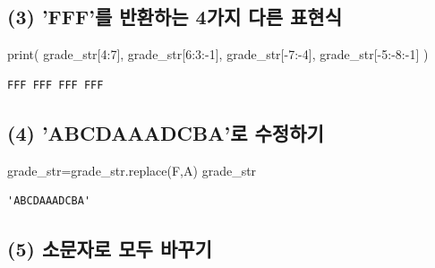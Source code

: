 \documentclass[
  a4paper,
  DIV=11,
  numbers=noendperiod]{scrreprt}
\newenvironment{Shaded}{\begin{snugshade}}{\end{snugshade}}
\newcommand{\BuiltInTok}[1]{\textcolor[rgb]{0.00,0.23,0.31}{#1}}
\newcommand{\DecValTok}[1]{\textcolor[rgb]{0.68,0.00,0.00}{#1}}
\newcommand{\NormalTok}[1]{\textcolor[rgb]{0.00,0.23,0.31}{#1}}
\newcommand{\OperatorTok}[1]{\textcolor[rgb]{0.37,0.37,0.37}{#1}}
\newcommand{\StringTok}[1]{\textcolor[rgb]{0.13,0.47,0.30}{#1}}
\begin{document}
\subsection*{(3) 'FFF'를 반환하는 4가지 다른
표현식}\label{fffuxb97c-uxbc18uxd658uxd558uxb294-4uxac00uxc9c0-uxb2e4uxb978-uxd45cuxd604uxc2dd}

\begin{Shaded}
\begin{Highlighting}[]
\BuiltInTok{print}\NormalTok{(}
\NormalTok{    grade\_str[}\DecValTok{4}\NormalTok{:}\DecValTok{7}\NormalTok{],}
\NormalTok{    grade\_str[}\DecValTok{6}\NormalTok{:}\DecValTok{3}\NormalTok{:}\OperatorTok{{-}}\DecValTok{1}\NormalTok{],}
\NormalTok{    grade\_str[}\OperatorTok{{-}}\DecValTok{7}\NormalTok{:}\OperatorTok{{-}}\DecValTok{4}\NormalTok{],}
\NormalTok{    grade\_str[}\OperatorTok{{-}}\DecValTok{5}\NormalTok{:}\OperatorTok{{-}}\DecValTok{8}\NormalTok{:}\OperatorTok{{-}}\DecValTok{1}\NormalTok{]}
\NormalTok{)}
\end{Highlighting}
\end{Shaded}

\begin{verbatim}
FFF FFF FFF FFF
\end{verbatim}

\subsection*{(4) 'ABCDAAADCBA'로
수정하기}\label{abcdaaadcbauxb85c-uxc218uxc815uxd558uxae30}

\begin{Shaded}
\begin{Highlighting}[]
\NormalTok{grade\_str}\OperatorTok{=}\NormalTok{grade\_str.replace(}\StringTok{\textquotesingle{}F\textquotesingle{}}\NormalTok{,}\StringTok{\textquotesingle{}A\textquotesingle{}}\NormalTok{)}
\NormalTok{grade\_str}
\end{Highlighting}
\end{Shaded}

\begin{verbatim}
'ABCDAAADCBA'
\end{verbatim}

\subsection*{(5) 소문자로 모두
바꾸기}\label{uxc18cuxbb38uxc790uxb85c-uxbaa8uxb450-uxbc14uxafb8uxae30}
\end{document}
